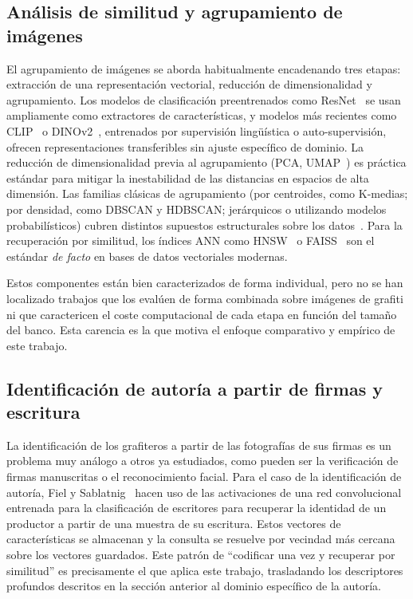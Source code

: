 \subsection{Análisis de similitud y agrupamiento de imágenes}
\label{subsec:art-emb-red-clus}

El agrupamiento de imágenes se aborda habitualmente encadenando tres etapas:
extracción de una representación vectorial, reducción de dimensionalidad y
agrupamiento. Los modelos de clasificación preentrenados como
ResNet~\cite{he_deep_2015} se usan ampliamente como extractores de
características, y modelos más recientes como CLIP~\cite{radford_learning_2021}
o DINOv2~\cite{oquab_dinov2_2024}, entrenados por supervisión lingüística o
auto-supervisión, ofrecen representaciones transferibles sin ajuste específico
de dominio. La reducción de dimensionalidad previa al agrupamiento (PCA,
UMAP~\cite{mcinnes_umap_2020}) es práctica estándar para mitigar la
inestabilidad de las distancias en espacios de alta dimensión. Las familias
clásicas de agrupamiento (por centroides, como K-medias; por densidad, como
DBSCAN y HDBSCAN; jerárquicos o utilizando modelos probabilísticos) cubren
distintos supuestos estructurales sobre los
datos~\cite{ester_density-based_1996, campello_density-based_2013,
arthur_k-means_2007}. Para la recuperación por similitud, los índices ANN como
HNSW~\cite{malkov_efficient_2018} o FAISS~\cite{johnson_billion-scale_2017} son
el estándar \textit{de facto} en bases de datos vectoriales modernas.

Estos componentes están bien caracterizados de forma individual, pero no se han
localizado trabajos que los evalúen de forma combinada sobre imágenes de
grafiti ni que caractericen el coste computacional de cada etapa en función del
tamaño del banco. Esta carencia es la que motiva el enfoque comparativo y
empírico de este trabajo.

\subsection{Identificación de autoría a partir de firmas y escritura}
\label{subsec:art-author-id}

La identificación de los grafiteros a partir de las fotografías de sus firmas
es un problema muy análogo a otros ya estudiados, como pueden ser la
verificación de firmas manuscritas o el reconocimiento facial. Para el caso de
la identificación de autoría, Fiel y Sablatnig~\cite{fiel_writer_2015} hacen
uso de las activaciones de una red convolucional entrenada para la
clasificación de escritores para recuperar la identidad de un productor a
partir de una muestra de su escritura. Estos vectores de características se
almacenan y la consulta se resuelve por vecindad más cercana sobre los vectores
guardados. Este patrón de \enquote{codificar una vez y recuperar por similitud}
es precisamente el que aplica este trabajo, trasladando los descriptores
profundos descritos en la sección anterior al dominio específico de la autoría.

